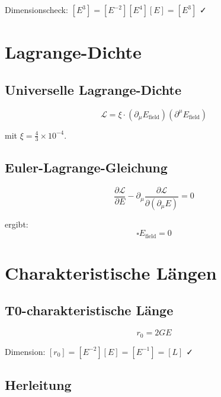 	Dimensionscheck: $[E^3] = [E^{-2}][E^4][E] = [E^3]$ ✓
	
	\section{Lagrange-Dichte}
	\label{sec:lagrangian}
	
	\subsection{Universelle Lagrange-Dichte}
	
	\begin{equation}
		\mathcal{L} = \xi \cdot (\partial_\mu E_{\text{field}})(\partial^\mu E_{\text{field}})
	\end{equation}
	
	mit $\xi = \frac{4}{3} \times 10^{-4}$.
	
	\subsection{Euler-Lagrange-Gleichung}
	
	\begin{equation}
		\frac{\partial \mathcal{L}}{\partial E} - \partial_\mu \frac{\partial \mathcal{L}}{\partial(\partial_\mu E)} = 0
	\end{equation}
	
	ergibt:
	\begin{equation}
		\square E_{\text{field}} = 0
	\end{equation}
	
	\section{Charakteristische Längen}
	\label{sec:characteristic_lengths}
	
	\subsection{T0-charakteristische Länge}
	
	\begin{equation}
		r_0 = 2GE
	\end{equation}
	
	Dimension: $[r_0] = [E^{-2}][E] = [E^{-1}] = [L]$ ✓
	
	\subsection{Herleitung}
	
